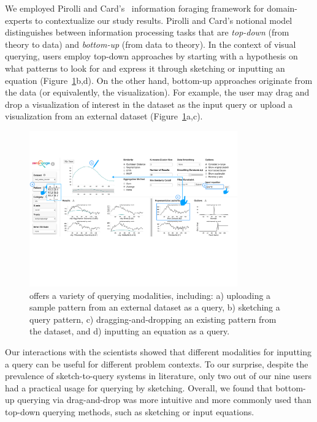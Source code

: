 We employed Pirolli and Card's~\cite{Pirolli} information foraging framework for domain-experts to contextualize our study results. Pirolli and Card's notional model distinguishes between information processing tasks that are \textit{top-down} (from theory to data) and \textit{bottom-up} (from data to theory). In the context of visual querying, users employ top-down approaches by starting with a hypothesis on what patterns to look for and express it through sketching or inputting an equation (Figure~\ref{fig:modalities}b,d). On the other hand, bottom-up approaches originate from the data (or equivalently, the visualization). For example, the user may drag and drop a visualization of interest in the dataset as the input query or upload a visualization from an external dataset (Figure~\ref{fig:modalities}a,c). 
\begin{figure}[h!]
\label{fig:modalities}
\centering
\includegraphics[width=0.8\textwidth]{figures/modalities.pdf}
\caption{\zv offers a variety of querying modalities, including: a) uploading a sample pattern from an external dataset as a query, b) sketching a query pattern, c) dragging-and-dropping an existing pattern from the dataset, and d) inputting an equation as a query.}
\end{figure}
\par Our interactions with the scientists showed that different modalities for inputting a query can be useful for different problem contexts. To our surprise, despite the prevalence of sketch-to-query systems in literature, only two out of our nine users had a practical usage for querying by sketching. Overall, we found that bottom-up querying via drag-and-drop was more intuitive and more commonly used than top-down querying methods, such as sketching or input equations. 
